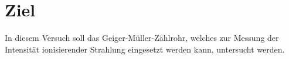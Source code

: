 \section{Ziel}
\label{sec:Ziel}
In diesem Versuch soll das Geiger-Müller-Zählrohr, welches zur Messung der Intensität
ionisierender Strahlung eingesetzt werden kann, untersucht werden.
